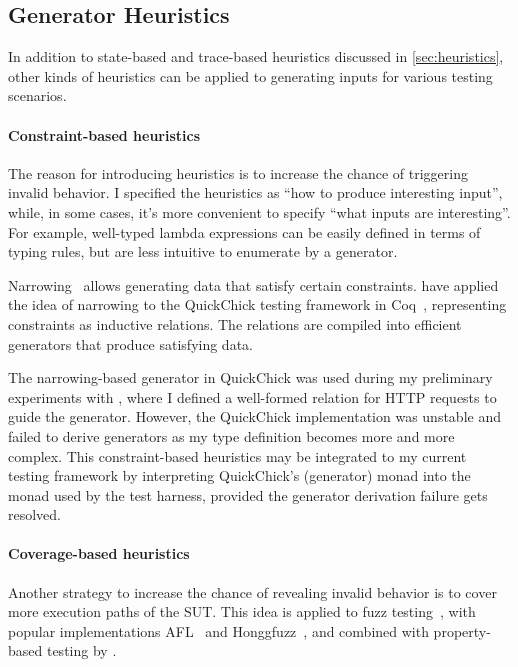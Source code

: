 \subsection{Generator Heuristics}
\label{sec:related-gen}

In addition to state-based and trace-based heuristics discussed in
\autoref{sec:heuristics}, other kinds of heuristics can be applied to generating
inputs for various testing scenarios.

\paragraph{Constraint-based heuristics}
The reason for introducing heuristics is to increase the chance of triggering
invalid behavior.  I specified the heuristics as ``how to produce interesting
input'', while, in some cases, it's more convenient to specify ``what inputs are
interesting''.  For example, well-typed lambda expressions can be easily defined
in terms of typing rules, but are less intuitive to enumerate by a generator.

Narrowing~\cite{narrowing} allows generating data that satisfy certain
constraints.  \citet{gengood} have applied the idea of narrowing to the
QuickChick testing framework in Coq~\cite{quickchick}, representing constraints
as inductive relations.  The relations are compiled into efficient generators
that produce satisfying data.

The narrowing-based generator in QuickChick was used during my preliminary
experiments with \http, where I defined a well-formed relation for HTTP requests
to guide the generator.  However, the QuickChick implementation was unstable and
failed to derive generators as my type definition becomes more and more complex.
This constraint-based heuristics may be integrated to my current testing
framework by interpreting QuickChick's  (generator) monad into
the  monad used by the test harness, provided the generator derivation
failure gets resolved.

\paragraph{Coverage-based heuristics}
Another strategy to increase the chance of revealing invalid behavior is to
cover more execution paths of the SUT.  This idea is applied to fuzz
testing~\cite{fuzz}, with popular implementations AFL~\cite{afl} and
Honggfuzz~\cite{honggfuzz}, and combined with property-based testing by
\citet{fuzzchick}.

